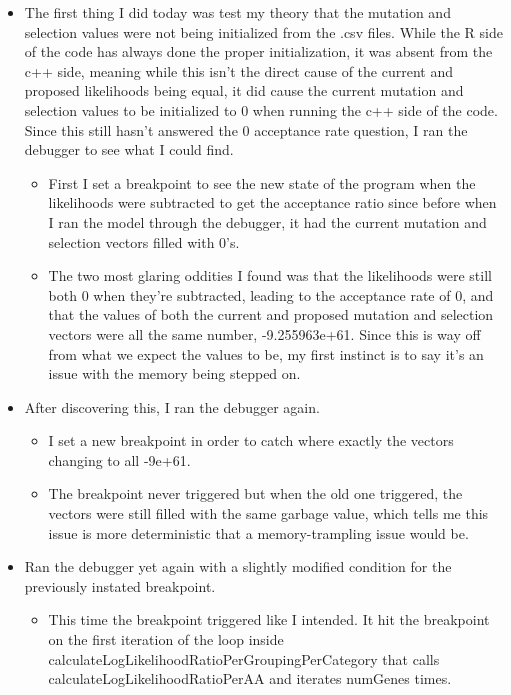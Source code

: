 \documentclass[11pt]{labbook}
\begin{document}
    \begin{itemize}
        \item The first thing I did today was test my theory that the mutation and selection values were not being initialized from the .csv files. While the R side of the code has always done the proper initialization, it was absent from the c++ side, meaning while this isn't the direct cause of the current and proposed likelihoods being equal, it did cause the current mutation and selection values to be initialized to 0 when running the c++ side of the code. Since this still hasn't answered the 0 acceptance rate question, I ran the debugger to see what I could find.
        \begin{itemize}
            \item First I set a breakpoint to see the new state of the program when the likelihoods were subtracted to get the acceptance ratio since before when I ran the model through the debugger, it had the current mutation and selection vectors filled with 0's.
            \item The two most glaring oddities I found was that the likelihoods were still both 0 when they're subtracted, leading to the acceptance rate of 0, and that the values of both the current and proposed mutation and selection vectors were all the same number, -9.255963e+61. Since this is way off from what we expect the values to be, my first instinct is to say it's an issue with the memory being stepped on.
        \end{itemize}
        \item After discovering this, I ran the debugger again.
            \begin{itemize}
                \item I set a new breakpoint in order to catch where exactly the vectors changing to all -9e+61.
                \item The breakpoint never triggered but when the old one triggered, the vectors were still filled with the same garbage value, which tells me this issue is more deterministic that a memory-trampling issue would be. 
            \end{itemize}
        \item Ran the debugger yet again with a slightly modified condition for the previously instated breakpoint.
            \begin{itemize}
                \item This time the breakpoint triggered like I intended. It hit the breakpoint on the first iteration of the loop inside calculateLogLikelihoodRatioPerGroupingPerCategory that calls calculateLogLikelihoodRatioPerAA and iterates numGenes times.

\end{itemize}
\end{itemize}
\end{document}

